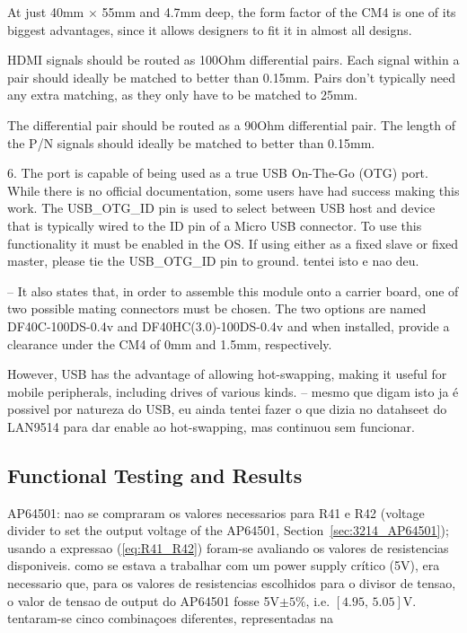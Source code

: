     At just 40mm $\times$ 55mm and 4.7mm deep, the form factor of the CM4 is one of its biggest advantages, since it allows designers to fit it in almost all designs.

    HDMI signals should be routed as 100Ohm differential pairs. Each signal within a pair should ideally be matched to better than 0.15mm. Pairs don't typically need any extra matching, as they only have to be matched to 25mm.

    The differential pair should be routed as a 90Ohm differential pair. The length of the P/N signals should ideally be matched to better than 0.15mm.

    6. The port is capable of being used as a true USB On-The-Go (OTG) port. While there is no official documentation, some users have had success making this work. The USB\_OTG\_ID pin is used to select between USB host and device that is typically wired to the ID pin of a Micro USB connector. To use this functionality it must be enabled in the OS. If using either as a fixed slave or fixed master, please tie the USB\_OTG\_ID pin to ground. tentei isto e nao deu.

	-- It also states that, in order to assemble this module onto a carrier board, one of two possible mating connectors must be chosen. The two options are named DF40C-100DS-0.4v and DF40HC(3.0)-100DS-0.4v and when installed, provide a clearance under the CM4 of 0mm and 1.5mm, respectively. 

    However, USB has the advantage of allowing hot-swapping, making it useful for mobile peripherals, including drives of various kinds. -- mesmo que digam isto ja é possivel por natureza do USB, eu ainda tentei fazer o que dizia no datahseet do LAN9514 para dar enable ao hot-swapping, mas continuou sem funcionar.
	

\subsection{Functional Testing and Results}\label{sec:55_FunctionalTesting}

AP64501:
nao se compraram os valores necessarios para R41 e R42 (voltage divider to set the output voltage of the AP64501, Section~\ref{sec:3214_AP64501}); usando a expressao (\ref{eq:R41_R42}) foram-se avaliando os valores de resistencias disponiveis. como se estava a trabalhar com um power supply crítico (5V), era necessario que, para os valores de resistencias escolhidos para o divisor de tensao, o valor de tensao de output do AP64501 fosse 5V$\pm 5\%$, i.e. $[4.95,\, 5.05]$V. tentaram-se cinco combinaçoes diferentes, representadas na 

